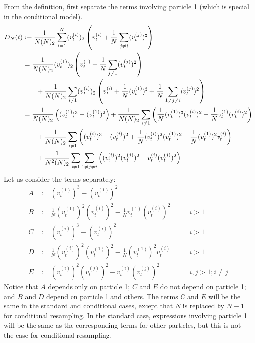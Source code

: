 \documentclass{article}
\newcommand{\vt}[2][t]{v_{#1}^{(#2)}}
\begin{document}
From the definition, first separate the terms involving particle 1 (which is special in the conditional model).
\begin{align}
D_N(t) &:= \frac{1}{N(N)_2} \sum_{i=1}^N (\vt{i})_2 \left( \vt{i} + \frac{1}{N} \sum_{j\neq i} (\vt{j})^2 \right) \notag\\
&= \frac{1}{N(N)_2} (\vt{1})_2 \left(\vt{1} + \frac{1}{N} \sum_{j\neq 1} (\vt{j})^2 \right) \notag\\
&\qquad+ \frac{1}{N(N)_2} \sum_{i\neq 1} (\vt{i})_2 \left( \vt{i} + \frac{1}{N}(\vt{1})^2 + \frac{1}{N} \sum_{1\neq j\neq i} (\vt{j})^2 \right) \notag\\
&= \frac{1}{N(N)_2} \left( (\vt{1})^3 - (\vt{1})^2 \right) 
+ \frac{1}{N(N)_2}\sum_{i\neq 1} \left( \frac{1}{N} (\vt{1})^2(\vt{i})^2 - \frac{1}{N}\vt{1}(\vt{i})^2 \right) \notag\\
&\qquad+ \frac{1}{N(N)_2}\sum_{i\neq 1} \left( (\vt{i})^3 - (\vt{i})^2 + \frac{1}{N}(\vt{i})^2(\vt{1})^2 - \frac{1}{N}(\vt{1})^2\vt{i} \right) \notag\\
&\qquad+ \frac{1}{N^2(N)_2}\sum_{i\neq 1}\sum_{1\neq j \neq i} \left( (\vt{i})^2(\vt{j})^2 - \vt{i}(\vt{j})^2 \right)
\end{align}
Let us consider the terms separately:
\begin{align*}
A &:= (\vt{1})^3 - (\vt{1})^2 \\
B &:= \frac{1}{N} (\vt{1})^2(\vt{i})^2 - \frac{1}{N}\vt{1}(\vt{i})^2 &\qquad i>1 \\
C &:= (\vt{i})^3 - (\vt{i})^2 &\qquad i>1 \\
D &:= \frac{1}{N}(\vt{i})^2(\vt{1})^2 - \frac{1}{N}(\vt{1})^2\vt{i} &\qquad i>1 \\
E &:= (\vt{i})^2(\vt{j})^2 - \vt{i}(\vt{j})^2 &\qquad i,j>1; i\neq j
\end{align*}
Notice that $A$ depends only on particle 1; $C$ and $E$ do not depend on particle 1; and $B$ and $D$ depend on particle 1 and others.
The terms $C$ and $E$ will be the same in the standard and conditional cases, except that $N$ is replaced by $N-1$ for conditional resampling.
In the standard case, expressions involving particle 1 will be the same as the corresponding terms for other particles, but this is not the case for conditional resampling.
\end{document}
